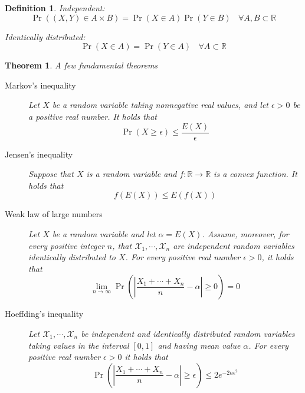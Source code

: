 \documentclass[aps,pra,onecolumn,notitlepage,superscriptaddress]{revtex4-1}
\newcommand{\R}{\mathbb{R}}
\newcommand{\spc}[1]{\mathcal{#1}}
\newcommand{\op}[1]{\operatorname{#1}}
\newtheorem{theo}{Theorem}
\newtheorem{defi}{Definition}
\begin{document}
    \begin{defi}
        Independent:
        \begin{equation}
            \op{Pr}((X,Y) \in A \times B) = \op{Pr}(X \in A) \op{Pr}(Y \in B) \ \ \ \ \forall A,B \subset \R
        \end{equation}

        Identically distributed:
        \begin{equation}
            \op{Pr}(X \in A) = \op{Pr}(Y \in A) \ \ \ \ \forall A \subset \R
        \end{equation}
    \end{defi}

    \begin{theo}
        A few fundamental theorems

        \begin{description}
            \item [Markov’s inequality] Let $X$ be a random variable taking nonnegative real values, and let $\epsilon > 0$ be a positive real number. It holds that
            \begin{equation}
                \op{Pr}(X \geq \epsilon) \leq \frac{E(X)}{\epsilon}
            \end{equation}

            \item [Jensen’s inequality] Suppose that $X$ is a random variable and $f : \R \to \R$ is a convex function. It holds that
            \begin{equation}
                f(E(X)) \leq E(f(X))
            \end{equation}

            \item [Weak law of large numbers] Let $X$ be a random variable and let $\alpha = E(X)$. Assume, moreover, for every positive integer $n$, that $\spc X_1, \cdots, \spc X_n$ are independent random variables identically distributed to $X$. For every positive real number $\epsilon > 0$, it holds that
            \begin{equation}
                \lim_{n \to \infty} \op{Pr} \left( \left| \frac{X_1 + \cdots + X_n}{n} - \alpha \right| \geq 0 \right) = 0
            \end{equation}

            \item [Hoeffding’s inequality] Let $\spc X_1, \cdots, \spc X_n$ be independent and identically distributed random variables taking values in the interval $[0,1]$ and having mean value $\alpha$. For every positive real number $\epsilon > 0$ it holds that
            \begin{equation}
                \op{Pr} \left( \left| \frac{X_1 + \cdots + X_n}{n} - \alpha \right| \geq \epsilon \right) \leq 2e^{-2n\epsilon^2}
            \end{equation}
        \end{description}  
    \end{theo}
\end{document}
